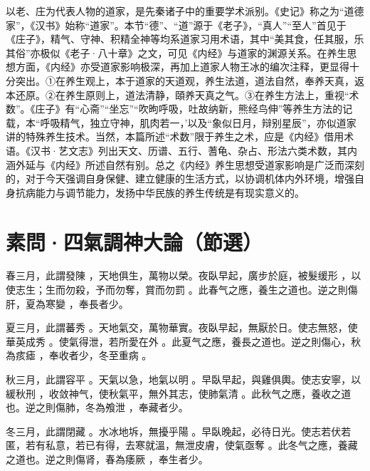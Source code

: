 \documentclass[draft,12pt]{ctexbook}
\begin{document}
以老、庄为代表人物的道家，是先秦诸子中的重要学术派别。《史记》称之为“道德家”，《汉书》始称“道家”。本节“德”、“道”源于《老子》，“真人”“至人”首见于《庄子》，精气、守神、积精全神等均系道家习用术语，其中“美其食，任其服，乐其俗”亦极似《老子·八十章》之文，可见《内经》与道家的渊源关系。在养生思想方面，《内经》亦受道家影响极深，再加上道家人物王冰的编次注释，更显得十分突出。①在养生观上，本于道家的天道观，养生法道，道法自然，奉养天真，返本还原。②在养生原则上，道法清静，頤养天真之气。③在养生方法上，重视“术数”。《庄子》有“心斋”“坐忘”“吹昫呼吸，吐故纳新，熊经鸟伸”等养生方法的记载，本“呼吸精气，独立守神，肌肉若一，’以及“象似日月，辩别星辰”，亦似道家讲的特殊养生技术。当然，本篇所述“术数”限于养生之术，应是《内经》借用术语。《汉书·艺文志》列出天文、历谱、五行、蓍龟、杂占、形法六类术数，其内涵外延与《内经》所述自然有别。总之《内经》养生思想受道家影响是广泛而深刻的，对于今天强调自身保健、建立健康的生活方式，以协调机体内外环境，增强自身抗病能力与调节能力，发扬中华民族的养生传统是有现实意义的。

\section{素問·四氣調神大論（節選）}%


\begin{yuanwen}
春三月，此謂發陳 ，天地俱生，萬物以榮。夜臥早起，廣步於庭，被髮缓形 ，以使志生；生而勿殺，予而勿奪，賞而勿罰 。此春气之應，養生之道也。逆之則傷肝，夏為寒變 ，奉長者少。

夏三月，此謂蕃秀 。天地氣交，萬物華實。夜臥早起，無厭於日。使志無怒，使華英成秀 。使氣得泄，若所愛在外 。此夏气之應，養長之道也。逆之則傷心，秋為痎瘧 ，奉收者少，冬至重病 。

秋三月，此謂容平 。天氣以急，地氣以明 。早臥早起，與雞俱輿。使志安寧，以緩秋刑 ，收敛神气，使秋氣平，無外其志，使肺氣清 。此秋气之應，養收之道也。逆之則傷肺，冬為飧泄 ，奉藏者少。

冬三月，此謂閉藏 。水冰地坼，無擾乎陽 。早臥晚起，必待日光。使志若伏若匿，若有私意，若已有得，去寒就溫，無泄皮膚，使氣亟奪 。此冬气之應，養藏之道也。逆之則傷肾，春為痿厥 ，奉生者少。
\end{yuanwen}

\end{document}
